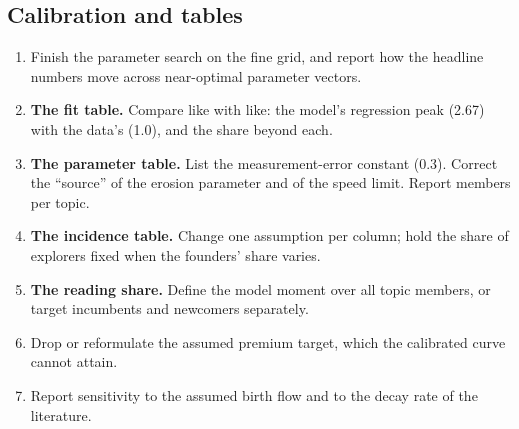 \subsection*{Calibration and tables}
\begin{enumerate}[resume]
\item Finish the parameter search on the fine grid, and report how the headline numbers move across near-optimal parameter vectors.
\item \textbf{The fit table.} Compare like with like: the model's regression peak (2.67) with the data's (1.0), and the share beyond each.
\item \textbf{The parameter table.} List the measurement-error constant (0.3). Correct the ``source'' of the erosion parameter and of the speed limit. Report members per topic.
\item \textbf{The incidence table.} Change one assumption per column; hold the share of explorers fixed when the founders' share varies.
\item \textbf{The reading share.} Define the model moment over all topic members, or target incumbents and newcomers separately.
\item Drop or reformulate the assumed premium target, which the calibrated curve cannot attain.
\item Report sensitivity to the assumed birth flow and to the decay rate of the literature.
\end{enumerate}

